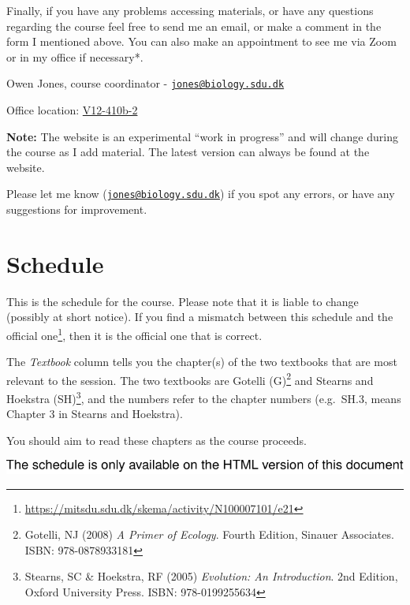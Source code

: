 \documentclass[
  a4paper]{book}
\begin{document}
Finally, if you have any problems accessing materials, or have any
questions regarding the course feel free to send me an email, or make a
comment in the form I mentioned above. You can also make an appointment
to see me via Zoom or in my office if necessary*.

Owen Jones, course coordinator -
\href{mailto:jones@biology.sdu.dk}{\nolinkurl{jones@biology.sdu.dk}}

Office location:
\href{https://clients.mapsindoors.com/sdu/573f26e4bc1f571b08094312/details/563cb94f423b7d0540c9a605}{V12-410b-2}

\begin{do-something}
\textbf{Note:} The website is an experimental ``work in progress'' and
will change during the course as I add material. The latest version can
always be found at the website.

Please let me know
(\href{mailto:jones@biology.sdu.dk}{\nolinkurl{jones@biology.sdu.dk}})
if you spot any errors, or have any suggestions for improvement.
\end{do-something}

\hypertarget{schedule}{%
\chapter{Schedule}\label{schedule}}

This is the schedule for the course. Please note that it is liable to
change (possibly at short notice). If you find a mismatch between this
schedule and the official one\footnote{\url{https://mitsdu.sdu.dk/skema/activity/N100007101/e21}},
then it is the official one that is correct.

The \emph{Textbook} column tells you the chapter(s) of the two textbooks
that are most relevant to the session. The two textbooks are Gotelli
(G)\footnote{ Gotelli, NJ (2008) \emph{A Primer of Ecology}. Fourth
  Edition, Sinauer Associates. ISBN: 978-0878933181} and Stearns and
Hoekstra (SH)\footnote{Stearns, SC \& Hoekstra, RF (2005)
  \emph{Evolution: An Introduction}. 2nd Edition, Oxford University
  Press. ISBN: 978-0199255634}, and the numbers refer to the chapter
numbers (e.g.~SH.3, means Chapter 3 in Stearns and Hoekstra).

You should aim to read these chapters as the course proceeds.

\includegraphics{BB512_files/figure-latex/unnamed-chunk-4-1.pdf}
\end{document}
